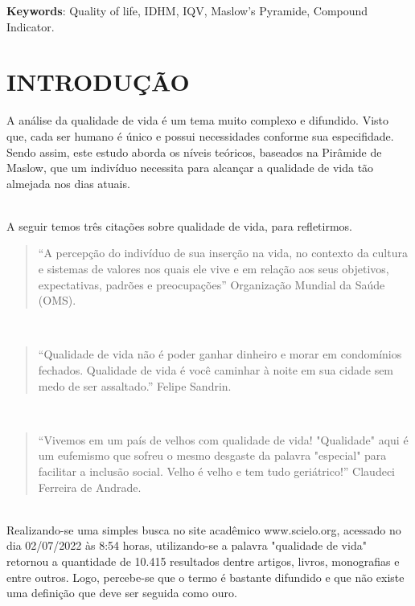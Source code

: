 \documentclass[a4paper, 10pt]{article}
\begin{document}
    \noindent\textbf{Keywords}: Quality of life, IDHM, IQV, Maslow's Pyramide, Compound Indicator.
    
    \newpage
      \large
      \section{INTRODUÇÃO}
      \onehalfspacing 
    A análise da qualidade de vida é um tema muito complexo e difundido. Visto que, cada ser humano é único e possui necessidades conforme sua especifidade. Sendo assim, este estudo aborda os níveis teóricos, baseados na Pirâmide de Maslow, que um indivíduo necessita para alcançar a qualidade de vida tão almejada nos dias atuais.
    
    \\
    A seguir temos três citações sobre qualidade de vida, para refletirmos.
 
    \begin{quote}
    {“A percepção do indivíduo de sua inserção na vida, no contexto da cultura e sistemas de valores nos quais ele vive e em relação aos seus objetivos, expectativas, padrões e preocupações” Organização Mundial da Saúde (OMS).}
    \end{quote}
    
     \\
   
    \begin{quote}
    {“Qualidade de vida não é poder ganhar dinheiro e morar em condomínios fechados. Qualidade de vida é você caminhar à noite em sua cidade sem medo de ser assaltado.” Felipe Sandrin.}
    \end{quote}
    
    \\
    
     \begin{quote}
    {“Vivemos em um país de velhos com qualidade de vida! "Qualidade" aqui é um eufemismo que sofreu o mesmo desgaste da palavra "especial" para facilitar a inclusão social. Velho é velho e tem tudo geriátrico!” Claudeci Ferreira de Andrade.}
    \end{quote}
    
    \\
    Realizando-se uma simples busca no site acadêmico www.scielo.org, acessado no dia 02/07/2022 às 8:54 horas, utilizando-se a palavra "qualidade de vida" retornou a quantidade de 10.415 resultados dentre artigos, livros, monografias e entre outros. Logo, percebe-se que o termo é bastante difundido e que não existe uma definição que deve ser seguida como ouro.
    
\end{document}
